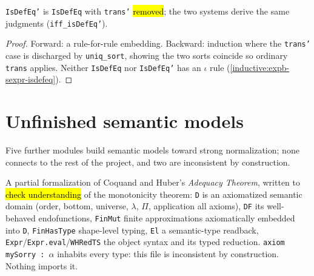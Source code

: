 \begin{lemma}
\label{thm:expb-isdefeq-prime}
\leanok
{}

 \texttt{IsDefEq'} is \texttt{IsDefEq} with \texttt{trans'} \hl{removed}; the two
systems derive the same judgments (\texttt{iff\_isDefEq'}).
\end{lemma}
\begin{proof}
\leanok
{} Forward: a rule-for-rule embedding. Backward: induction where the \texttt{trans'} case
is discharged by \texttt{uniq\_sort}, showing the two sorts coincide so ordinary \texttt{trans}
applies.
 Neither \texttt{IsDefEq} nor \texttt{IsDefEq'} has an $\iota$ rule
(\ref{inductive:expb-sexpr-isdefeq}).
\end{proof}

\section{Unfinished semantic models}

Five further modules build semantic models toward strong normalization; none connects to the rest
of the project, and two are inconsistent by construction.

\begin{definition}
\label{family:expb-thierry-domain}
\leanok
{}

 A partial formalization of Coquand and Huber's \emph{Adequacy Theorem}, written to
\hl{check understanding} of the monotonicity theorem: \texttt{D} is an axiomatized semantic domain
(order, bottom, universe, $\lambda$, $\Pi$, application all axioms), \texttt{DF} its well-behaved
endofunctions, \texttt{FinMut} finite approximations axiomatically embedded into \texttt{D},
\texttt{FinHasType} shape-level typing, \texttt{El} a semantic-type readback,
\texttt{Expr}/\texttt{Expr.eval}/\texttt{WHRedTS} the object syntax and its typed reduction.
 \texttt{axiom mySorry : $\alpha$} inhabits every type: this file is inconsistent by
construction. Nothing imports it.
\end{definition}


